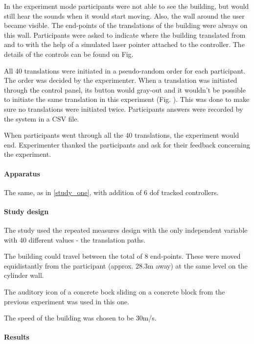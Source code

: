In the experiment mode participants were not able to see the building, but would still hear the sounds when it would start moving. Also, the wall around the user became visible. The end-points of the translations of the building were always on this wall. Participants were asked to indicate where the building translated from and to with the help of a simulated laser pointer attached to the controller. The details of the controls can be found on Fig. %

All 40 translations were initiated in a pseudo-random order for each participant. The order was decided by the experimenter. When a translation was initiated through the control panel, its button would gray-out and it wouldn't be possible to initiate the same translation in this experiment (Fig. ). This was done to make sure no translations were initiated twice.
Participants answers were recorded by the system in a CSV file.

When participants went through all the 40 translations, the experiment would end. Experimenter thanked the participants and ask for their feedback concerning the experiment.

\paragraph{Apparatus} The same, as in \ref{study_one}, with addition of 6 \gls{dof} tracked controllers.

\paragraph{Study design}
The study used the repeated measures design with the only independent variable with 40 different values - the translation paths.

The building could travel between the total of 8 end-points. These were moved equidistantly from the participant (approx. 28.3m away) at the same level on the cylinder wall.

The auditory icon of a concrete bock sliding on a concrete block from the previous experiment was used in this one. 

The speed of the building was chosen to be 30m/s.

\paragraph{Results}


